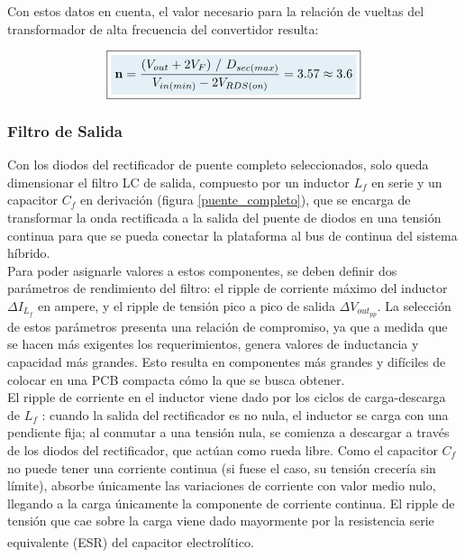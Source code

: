 Con estos datos en cuenta, el valor necesario para la relación de vueltas del transformador de alta frecuencia del convertidor resulta:

\begin{equation}\label{relacion_vueltas_valor}
    \boxed{
    \highlight{\mathbf{n} = \frac{(V_{out}+2V_F)\ /\ D_{sec(max)}}{V_{in(min)}-2V_{RDS(on)}} = \num{3.57} \approx \num{3.6}}
    }
\end{equation}

\subsubsection{Filtro de Salida}

Con los diodos del rectificador de puente completo seleccionados, solo queda dimensionar el filtro LC de salida, compuesto por un inductor $L_f$ en serie y un capacitor $C_f$ en derivación (figura \ref{puente_completo}), que se encarga de transformar la onda rectificada a la salida del puente de diodos en una tensión continua para que se pueda conectar la plataforma al bus de continua del sistema híbrido.\\

Para poder asignarle valores a estos componentes, se deben definir dos parámetros de rendimiento del filtro: el ripple de corriente máximo del inductor $\Delta I_{L_f}$ en ampere, y el ripple de tensión pico a pico de salida $\Delta V_{out_{pp}}$. La selección de estos parámetros presenta una relación de compromiso, ya que a medida que se hacen más exigentes los requerimientos, genera valores de inductancia y capacidad más grandes. Esto resulta en componentes más grandes y difíciles de colocar en una PCB compacta cómo la que se busca obtener.\\

El ripple de corriente en el inductor viene dado por los ciclos de carga-descarga de $L_f$ : cuando la salida del rectificador es no nula, el inductor se carga con una pendiente fija; al conmutar a una tensión nula, se comienza a descargar a través de los diodos del rectificador, que actúan como rueda libre. Como el capacitor $C_f$ no puede tener una corriente continua (si fuese el caso, su tensión crecería sin límite), absorbe únicamente las variaciones de corriente con valor medio nulo, llegando a la carga únicamente la componente de corriente continua. El ripple de tensión que cae sobre la carga viene dado mayormente por la resistencia serie equivalente (ESR) del capacitor electrolítico.\textsuperscript{\cite{SoftSwitchPWM}}\\

